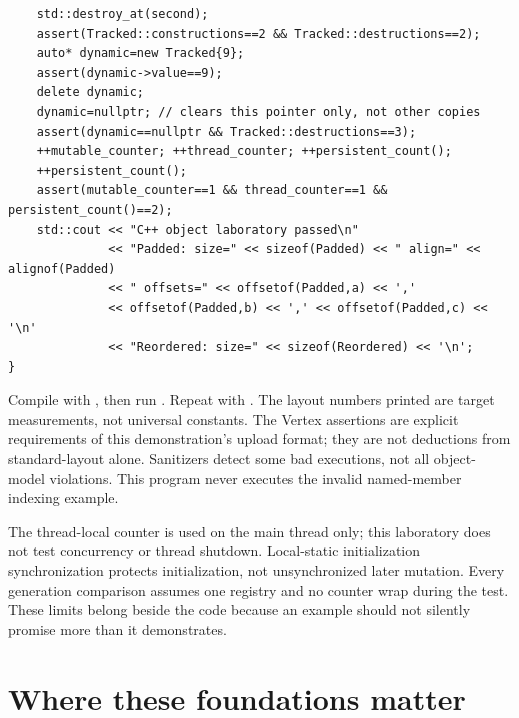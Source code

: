 \begin{verbatim}
    std::destroy_at(second);
    assert(Tracked::constructions==2 && Tracked::destructions==2);
    auto* dynamic=new Tracked{9};
    assert(dynamic->value==9);
    delete dynamic;
    dynamic=nullptr; // clears this pointer only, not other copies
    assert(dynamic==nullptr && Tracked::destructions==3);
    ++mutable_counter; ++thread_counter; ++persistent_count();
    ++persistent_count();
    assert(mutable_counter==1 && thread_counter==1 && persistent_count()==2);
    std::cout << "C++ object laboratory passed\n"
              << "Padded: size=" << sizeof(Padded) << " align=" << alignof(Padded)
              << " offsets=" << offsetof(Padded,a) << ','
              << offsetof(Padded,b) << ',' << offsetof(Padded,c) << '\n'
              << "Reordered: size=" << sizeof(Reordered) << '\n';
}
\end{verbatim}

Compile with , then run . Repeat with . The layout numbers printed are target measurements, not universal constants. The Vertex assertions are explicit requirements of this demonstration's upload format; they are not deductions from standard-layout alone. Sanitizers detect some bad executions, not all object-model violations. This program never executes the invalid named-member indexing example.

The thread-local counter is used on the main thread only; this laboratory does not test concurrency or thread shutdown. Local-static initialization synchronization protects initialization, not unsynchronized later mutation. Every generation comparison assumes one registry and no counter wrap during the test. These limits belong beside the code because an example should not silently promise more than it demonstrates.

\section{Where these foundations matter}\label{05-engine-i-ch004-where-these-foundations-matter}

